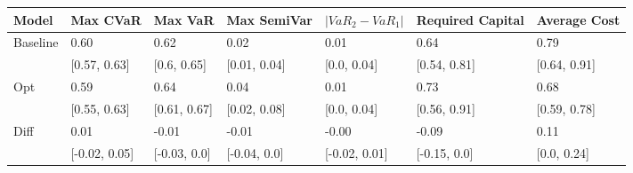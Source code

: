 \begin{tabular}{lllllll}
\toprule
   Model &      Max CVaR &      Max VaR &  Max SemiVar & $|VaR_2 - VaR_1|$ & Required Capital & Average Cost \\
\midrule
Baseline &          0.60 &         0.62 &         0.02 &              0.01 &             0.64 &         0.79 \\
         &  [0.57, 0.63] &  [0.6, 0.65] & [0.01, 0.04] &       [0.0, 0.04] &     [0.54, 0.81] & [0.64, 0.91] \\
     Opt &          0.59 &         0.64 &         0.04 &              0.01 &             0.73 &         0.68 \\
         &  [0.55, 0.63] & [0.61, 0.67] & [0.02, 0.08] &       [0.0, 0.04] &     [0.56, 0.91] & [0.59, 0.78] \\
    Diff &          0.01 &        -0.01 &        -0.01 &             -0.00 &            -0.09 &         0.11 \\
         & [-0.02, 0.05] & [-0.03, 0.0] & [-0.04, 0.0] &     [-0.02, 0.01] &     [-0.15, 0.0] &  [0.0, 0.24] \\
\bottomrule
\end{tabular}
